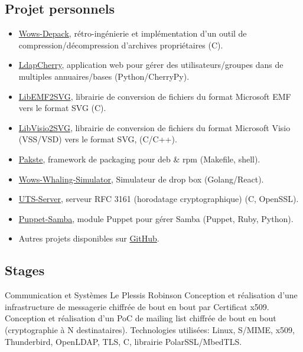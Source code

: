 \documentclass[10pt,a4paper,sans]{moderncv}
\begin{document}
\subsection{Projet personnels}
        {}
        {}
        {}
        {
            \begin{itemize}
            \item \href{https://github.com/wows-tools/wows-depack}{Wows-Depack}, rétro-ingénierie et implémentation d'un outil de compression/décompression d'archives propriétaires (C).
            \item \href{https://github.com/kakwa/ldapcherry}{LdapCherry}, application web pour gérer des utilisateurs/groupes dans de multiples annuaires/bases (Python/CherryPy).
            \item \href{https://github.com/kakwa/libemf2svg}{LibEMF2SVG}, librairie de conversion de fichiers du format Microsoft EMF vers le format SVG (C).
            \item \href{https://github.com/kakwa/libvisio2svg}{LibVisio2SVG}, librairie de conversion de fichiers du format Microsoft Visio (VSS/VSD) vers le format SVG, (C/C++).
            \item \href{https://github.com/kakwa/pakste}{Pakste}, framework de packaging pour deb \& rpm (Makefile, shell).
            \item \href{https://github.com/wows-tools/wows-whaling-simulator}{Wows-Whaling-Simulator}, Simulateur de drop box (Golang/React).
            \item \href{https://github.com/kakwa/uts-server}{UTS-Server}, serveur RFC 3161 (horodatage cryptographique) (C, OpenSSL).
            \item \href{https://github.com/kakwa/puppet-samba}{Puppet-Samba}, module Puppet pour gérer Samba (Puppet, Ruby, Python).
            \item Autres projets disponibles sur \href{https://github.com/kakwa?tab=repositories&q=&type=&language=&sort=stargazers}{GitHub}.
            \end{itemize}
        }

\subsection{Stages}

        {Communication et Systèmes}
        {Le Plessis Robinson}
        {}
        {Conception et réalisation d'une infrastructure de messagerie chiffrée de bout en bout par
         Certificat x509. Conception et réalisation d'un PoC de mailing list chiffrée de bout en bout
         (cryptographie à N destinataires).
         \newline Technologies utilisées: Linux, S/MIME, x509, Thunderbird, OpenLDAP, TLS, C, librairie PolarSSL/MbedTLS.
        }
\end{document}
